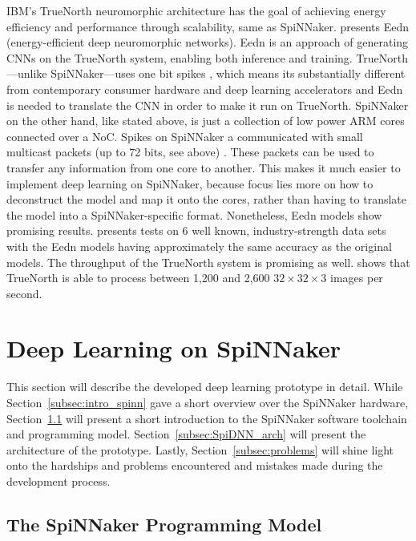 \documentclass[]{article}
\begin{document}
IBM's TrueNorth neuromorphic architecture has the goal of
achieving energy efficiency and performance through scalability,
same as SpiNNaker.
\citet{esser_et_al_2016} presents Eedn (energy-efficient deep
neuromorphic networks).
Eedn is an approach of generating CNNs on the TrueNorth system,
enabling both inference and training.
TrueNorth---unlike SpiNNaker---uses one bit spikes
\citep{esser_et_al_2016}, which means its substantially different from
contemporary consumer hardware and deep learning accelerators and Eedn
is needed to translate the CNN in order to make it run on TrueNorth.
SpiNNaker on the other hand, like stated above, is just a collection
of low power ARM cores connected over a NoC.
Spikes on SpiNNaker a communicated with small multicast packets
(up to 72 bits, see above) \citep{furber_et_al_2020}.
These packets can be used to transfer any information from one core
to another.
This makes it much easier to implement deep learning on SpiNNaker,
because focus lies more on how to deconstruct the model and map it
onto the cores, rather than having to translate the model into a
SpiNNaker-specific format.
Nonetheless, Eedn models show promising results.
\citet{esser_et_al_2016} presents tests on 6 well known,
industry-strength data sets with the Eedn models having approximately
the same accuracy as the original models.
The throughput of the TrueNorth system is promising as well.
\citet{esser_et_al_2016} shows that TrueNorth is able to process
between 1,200 and 2,600 $32\times32\times3$ images per second.



\section{Deep Learning on SpiNNaker} %
\label{sec:SpiDNN}

This section will describe the developed deep learning prototype in
detail.
While Section~\ref{subsec:intro_spinn} gave a short overview over the
SpiNNaker hardware, Section~\ref{subsec:spinn_toolchain} will present
a short introduction to the SpiNNaker software toolchain and
programming model.
Section~\ref{subsec:SpiDNN_arch} will present the architecture of the
prototype.
Lastly, Section~\ref{subsec:problems} will shine light onto the
hardships and problems encountered and mistakes made during the
development process.


\subsection{The SpiNNaker Programming Model} %
\label{subsec:spinn_toolchain}
\end{document}
